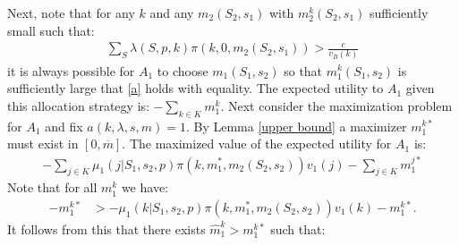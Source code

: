 \documentclass[12pt]{article}
\newcommand{\pderiv}[2]{\frac{\partial #1}{\partial #2}}
\begin{document}
Next, note that for any $k$ and any $m_2(S_2,s_1)$ with $m_2^k(S_2,s_1)$ sufficiently small such that:
\begin{align}
\sum_S\lambda(S,p,k)\pi(k,0,m_2(S_2,s_1))>\frac{c}{v_B(k)}\label{0}
\end{align}it is always possible for $A_1$ to choose $m_1(S_1,s_2)$ so that $m_1^k(S_1,s_2)$ is sufficiently large that \eqref{a} holds with equality.  The expected utility to $A_1$ given this allocation strategy is: $-\sum_{k\in K}m_1^k$.  Next consider the maximization problem for $A_1$ and fix $a(k,\lambda,s,m)=1$.  By Lemma \ref{upper bound} a maximizer $m_1^{k*}$ must exist in $[0,\overline{m}]$.  %
The maximized value of the expected utility for $A_1$ is:
\begin{align*}
-\sum_{j\in K}\mu_1(j|S_1,s_2,p)\pi(k,m_1^*,m_2(S_2,s_2))v_1(j)-\sum_{j\in K}m_1^{j*}
\end{align*}Note that for all $m_1^k$ we have:
\begin{align*}
-m_1^{k*}&>-\mu_1(k|S_1,s_2,p)\pi(k,m_1^*,m_2(S_2,s_2))v_1(k)-m_1^{k*}.
\end{align*}It follows from this that there exists $\widehat{m}_1^{k}>m_1^{k*}$ such that:
\end{document}
